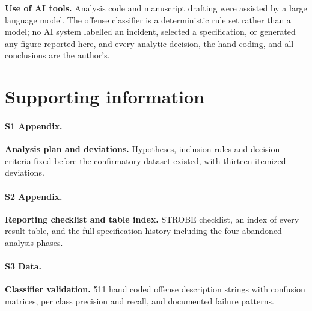 \documentclass[12pt,letterpaper]{article}
\begin{document}
\textbf{Use of AI tools.} Analysis code and manuscript drafting were assisted by a
large language model. The offense classifier is a deterministic rule set rather than
a model; no AI system labelled an incident, selected a specification, or generated
any figure reported here, and every analytic decision, the hand coding, and all
conclusions are the author's.


\section{Supporting information}

\paragraph{S1 Appendix.} {\bf Analysis plan and deviations.} Hypotheses, inclusion
rules and decision criteria fixed before the confirmatory dataset existed, with
thirteen itemized deviations.

\paragraph{S2 Appendix.} {\bf Reporting checklist and table index.} STROBE checklist,
an index of every result table, and the full specification history including the four
abandoned analysis phases.

\paragraph{S3 Data.} {\bf Classifier validation.} 511 hand coded offense description
strings with confusion matrices, per class precision and recall, and documented
failure patterns.
\end{document}
